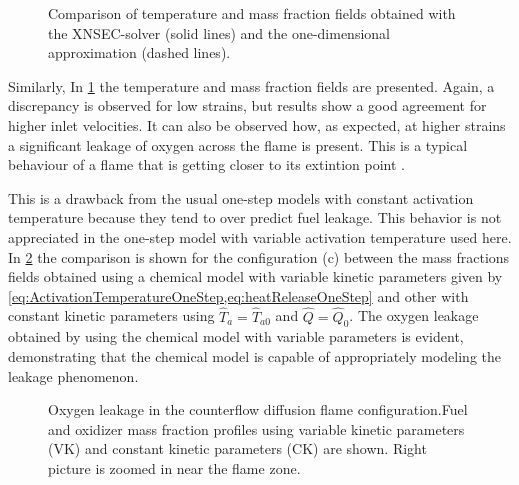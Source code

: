  
 \tikzexternaldisable
 \begin{figure}[p]
 	\centering
 	\caption[Comparison of temperature and mass fraction fields obtained with the XNSEC-solver and the one-dimensional approximation.]{Comparison of temperature and mass fraction fields obtained with the XNSEC-solver (solid lines) and the one-dimensional approximation (dashed lines).}
 	\label{fig:BoSSS_1D_Comparison}
 \end{figure}
 \tikzexternalenable
Similarly, In \cref{fig:BoSSS_1D_Comparison} the temperature and mass fraction fields are presented. Again, a discrepancy is observed for low strains, but results show a good agreement for higher inlet velocities. It can also be observed how, as expected, at higher strains a significant leakage of oxygen across the flame is present. This is a typical behaviour of a flame that is getting closer to its extintion point \parencite{fernandez-tarrazoSimpleOnestepChemistry2006}.  

This is a drawback from the usual one-step models with constant activation temperature because they tend to over predict fuel leakage. This behavior is not appreciated in the one-step model with variable activation temperature used here.  In \cref{fig:VarParams} the comparison is shown for the configuration (c) between the mass fractions fields obtained using a chemical model with variable kinetic parameters given by \cref{eq:ActivationTemperatureOneStep,eq:heatReleaseOneStep} and other with constant kinetic parameters using $\hat T_a = \hat T_{a0}$ and  $\hat Q = \hat Q_{0}$.  The oxygen leakage obtained by using the chemical model with variable parameters is evident, demonstrating that the chemical model is capable of appropriately modeling the leakage phenomenon. 
 
 
 \begin{figure}[h]
 	\centering
 	\caption[Fuel and oxidizer mass fraction profiles using constant kinetic parameters and variable kinetic parameters]{Oxygen leakage in the counterflow diffusion flame configuration.Fuel and oxidizer mass fraction profiles  using variable kinetic parameters (VK) and constant kinetic parameters (CK) are shown. Right picture is zoomed in near the flame zone.} \label{fig:VarParams}
 \end{figure}

